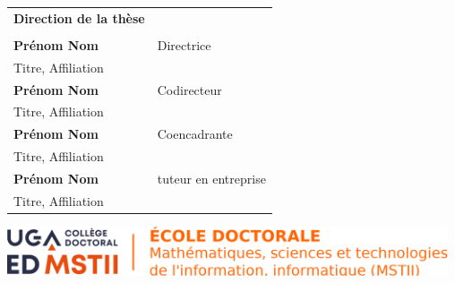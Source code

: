 \documentclass[french,12pt,a4paper]{book}
\begin{document}
\begin{titlepage}
\begin{tabular}{|p{7cm}l}
\end{tabular} 

\medskip
\begin{tabular}{|p{7cm}l}
\arrayrulecolor{orange}
{\footnotesize \textbf{Direction de la thèse}}\\
& \\
\textbf{Prénom Nom} &   Directrice\\ 
Titre, Affiliation & \\
\textbf{Prénom Nom} &   Codirecteur\\ 
Titre, Affiliation  &   \\ 
\textbf{Prénom Nom} &   Coencadrante\\ 
Titre, Affiliation  &   \\ 
\textbf{Prénom Nom} &  tuteur en entreprise \\ 
Titre, Affiliation  &   \\ 


\end{tabular} 


\end{titlepage}

\frontmatter                 %
\tableofcontents             %
\cleardoublepage
\mainmatter                  %
















\Ifthispageodd{\newpage\thispagestyle{empty}\null\newpage}{}
\thispagestyle{empty}
\selectfont

\lhead{}
\rhead{}
\rfoot{}
\cfoot{}
\lfoot{}

\noindent 
\includegraphics[height=1.45cm]{logo/mstii2.png}
\vspace{1cm}
\selectfont
\end{document}

